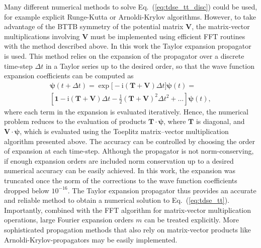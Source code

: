 \documentclass[
pra%
,preprint%
,amssymb, nobibnotes, aps, superscriptaddress, floatfix]{revtex4}
\renewcommand{\imath}{\mathrm{i}}
\newcommand{\Tmat}{\mathbf{T}}
\newcommand{\Vmat}{\mathbf{V}}
\newcommand{\Pvec}{\boldsymbol{\psi}}
\begin{document}
Many different numerical methods to solve Eq.~(\ref{eq:tdse_tt_disc}) could be used, for example explicit Runge-Kutta or Arnoldi-Krylov algorithms. 
However, to take advantage of the BTTB symmetry of the potential matrix $\Vmat$, the matrix-vector multiplications involving $\Vmat$ must be implemented using efficient FFT routines with the method described above.
In this work the Taylor expansion propagator is used. This method relies on the expansion of the propagator over a discrete time-step $\Delta t$ in a Taylor series up to the desired order, so that the wave function expansion coefficients can be computed as
\begin{align}
\Pvec(t+\Delta t) = \exp\big[ -\imath ( \Tmat + \Vmat )\Delta t \big] \Pvec(t) = \nonumber\\
[ \mathbf{1} - 
\imath ( \Tmat + \Vmat )\Delta t 
-  \frac{1}{2}( \Tmat + \Vmat )^2 \Delta t^2 + \ldots] \Pvec(t),\label{eq:Taylor_expansion_propagator}
\end{align}
where each term in the expansion is evaluated iteratively. Hence, the numerical problem reduces to the evaluation of products $\Tmat\cdot\Pvec$, where $\mathbf{T}$ is diagonal, and $\Vmat\cdot\Pvec$, which is evaluated using the Toeplitz matrix--vector multiplication algorithm presented above. 
The accuracy can be controlled by choosing  the order of expansion at each time-step.
Although the propagator is not norm-conserving, if enough expansion orders are included norm conservation up to a desired numerical accuracy can be easily achieved.
In this work, the expansion was truncated once the norm of the corrections to the wave function coefficients dropped below $10^{-16}$.
The Taylor expansion propagator thus provides an accurate and reliable method to obtain a numerical solution to Eq.~(\ref{eq:tdse_tt}). Importantly, combined with the FFT algorithm for matrix-vector multiplication operations, large Fourier expansion orders $m$ can be treated explicitly.
More sophisticated propagation methods that also rely on matrix-vector products like Arnoldi-Krylov-propagators may be easily implemented.
\end{document}
